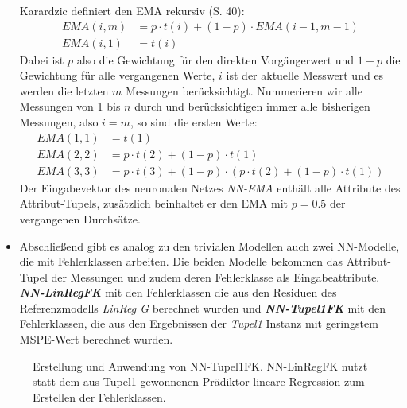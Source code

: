 \documentclass[
	twoside,
	12pt,
	a4paper,
	BCOR10mm,
	DIV14,
	listof=totoc,
	bibliography=totoc,
	headsepline
]{scrreprt}
\begin{document}
\begin{itemize}
	Karardzic definiert den EMA rekursiv \cite{kantardzic2011data} (S. 40):
	\begin{align*}
	EMA(i,m) &= p \cdot t(i)+(1-p) \cdot EMA(i-1,m-1)\\
	EMA(i,1) &= t(i)
	\end{align*}
	Dabei ist $p$ also die Gewichtung für den direkten Vorgängerwert und $1-p$ die Gewichtung für alle vergangenen Werte, $i$ ist der aktuelle Messwert und es werden die letzten $m$ Messungen berücksichtigt. Nummerieren wir alle Messungen von 1 bis $n$ durch und berücksichtigen immer alle bisherigen Messungen, also $i = m$, so sind die ersten Werte:
	\begin{align*}
	EMA(1,1) &= t(1)\\
	EMA(2,2) &=  p \cdot t(2)+(1-p) \cdot t(1)\\
	EMA(3,3) &=  p \cdot t(3)+(1-p) \cdot (p \cdot t(2)+(1-p) \cdot t(1))
	\end{align*}
	Der Eingabevektor des neuronalen Netzes \textit{NN-EMA} enthält alle Attribute des Attribut-Tupels, zusätzlich beinhaltet er den EMA mit $p=0.5$ der vergangenen Durchsätze.
	\item Abschließend gibt es analog zu den trivialen Modellen auch zwei NN-Modelle, die mit Fehlerklassen arbeiten.
	Die beiden Modelle bekommen das Attribut-Tupel der Messungen und zudem deren Fehlerklasse als Eingabeattribute.
	\textit{\textbf{NN-LinRegFK}} mit den Fehlerklassen die aus den Residuen des Referenzmodells \textit{LinReg G} berechnet wurden und \textit{\textbf{NN-Tupel1FK}} mit den Fehlerklassen, die aus den Ergebnissen der \textit{Tupel1} Instanz mit geringstem MSPE-Wert berechnet wurden.
\end{itemize}

\begin{figure}
	\centering
	\caption{Erstellung und Anwendung von NN-Tupel1FK. NN-LinRegFK nutzt statt dem aus Tupel1 gewonnenen Prädiktor lineare Regression zum Erstellen der Fehlerklassen.}
	\label{fig:linregfkvstupel1fk}
\end{figure}
\end{document}
